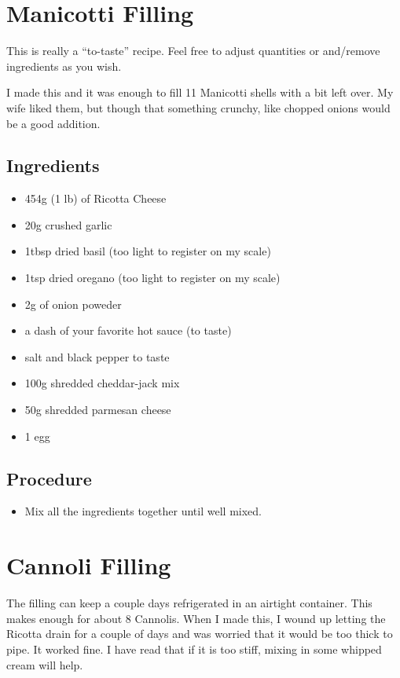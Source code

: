 \documentclass[10pt, openany]{book}
\begin{document}
\section{Manicotti Filling}
\label{extra:ManicottFilling}
This is really a ``to-taste'' recipe.  Feel free to adjust quantities or and/remove ingredients as you wish.

I made this and it was enough to fill 11 Manicotti shells with a bit left over.  My wife liked them, but though that something crunchy, like chopped onions would be a good addition.

\subsection{Ingredients}
\begin{itemize}
  \item 454g (1 lb) of Ricotta Cheese
  \item 20g crushed garlic
  \item 1tbsp dried basil (too light to register on my scale)
  \item 1tsp dried oregano (too light to register on my scale)
  \item 2g of onion poweder
  \item a dash of your favorite hot sauce (to taste)
  \item salt and black pepper to taste
  \item 100g shredded cheddar-jack mix
  \item 50g shredded parmesan cheese
  \item 1 egg
\end{itemize}
\subsection{Procedure}
\begin{itemize}
  \item Mix all the ingredients together until well mixed.
\end{itemize}

\section{Cannoli Filling}
\label{extra:CannoliFilling}
The filling can keep a couple days refrigerated in an airtight container.  This makes enough for about 8 Cannolis.  When I made this, I wound up letting the Ricotta drain for a couple of days and was worried that it would be too thick to pipe.  It worked fine.  I have read that if it is too stiff, mixing in some whipped cream will help.
\end{document}
